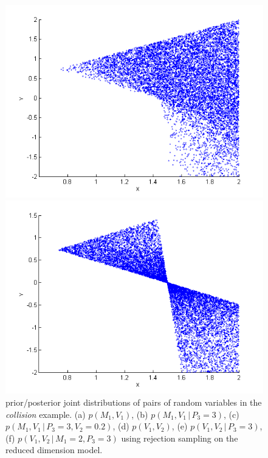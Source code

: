 \documentclass{article}
\newcommand{\pr}{p}
\newcommand{\nn}{0.16}
\begin{document}
\begin{figure}
\begin{center}
\begin{minipage}[b]{\nn\textwidth}
                \includegraphics[width=1\textwidth]{Figs/col_v1v2whenPis3.png}
        \end{minipage}%
\begin{minipage}[b]{\nn\textwidth}
                \includegraphics[width=1\textwidth]{Figs/colV1V2givenPis3M1is2.png}
        \end{minipage}%
\end{center}
\vspace{-1mm}
\caption{\footnotesize
prior/posterior joint distributions of pairs of random variables in the \emph{collision} example. 
(a) $\pr(M_1, V_1)$,
(b) $\pr(M_1, V_1 \, | \, P_3 = 3)$,
(c) $\pr(M_1, V_1 \, | \, P_3 = 3, V_2 = 0.2)$,
(d) $\pr(V_1, V_2)$,
(e) $\pr(V_1, V_2 \, | \, P_3 = 3)$,
(f) $\pr(V_1, V_2 \, | \, M_1 =2, P_3 = 3)$
using rejection sampling on the reduced dimension model.
} 
\label{fig:mom}
\end{figure}
\end{document}

